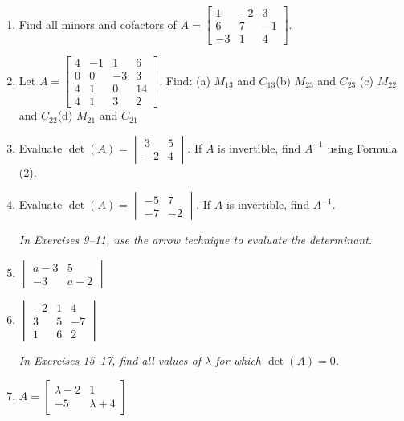 \documentclass{article}
\theoremstyle{mystyle}
\begin{document}
\begin{enumerate}

\item[1.] Find all minors and cofactors of
$A=\begin{bmatrix}1&-2&3\\6&7&-1\\-3&1&4\end{bmatrix}$.

\item[3.] Let $A=\begin{bmatrix}4&-1&1&6\\0&0&-3&3\\4&1&0&14\\4&1&3&2\end{bmatrix}$. Find:
(a) $M_{13}$ and $C_{13}$\quad (b) $M_{23}$ and $C_{23}$\quad
(c) $M_{22}$ and $C_{22}$\quad (d) $M_{21}$ and $C_{21}$

\item[5.] Evaluate $\det(A)=\begin{vmatrix}3&5\\-2&4\end{vmatrix}$. If $A$ is invertible, find $A^{-1}$ using Formula (2).

\item[7.] Evaluate $\det(A)=\begin{vmatrix}-5&7\\-7&-2\end{vmatrix}$. If $A$ is invertible, find $A^{-1}$.

\noindent\textit{In Exercises 9--11, use the arrow technique to evaluate the determinant.}

\item[9.] $\begin{vmatrix}a-3&5\\-3&a-2\end{vmatrix}$

\item[11.] $\begin{vmatrix}-2&1&4\\3&5&-7\\1&6&2\end{vmatrix}$

\noindent\textit{In Exercises 15--17, find all values of $\lambda$ for which $\det(A)=0$.}

\item[15.] $A=\begin{bmatrix}\lambda-2&1\\-5&\lambda+4\end{bmatrix}$


\end{enumerate}
\end{document}
